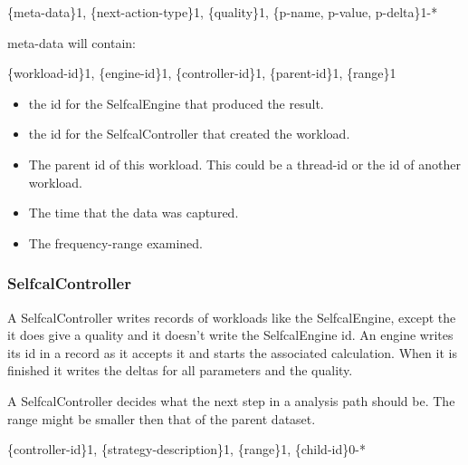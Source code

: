 \documentclass[]{lofar}
\begin{document}
        \{meta-data\}1, \{next-action-type\}1, \{quality\}1, \{p-name, p-value, p-delta\}1-*

        meta-data will contain:

        \{workload-id\}1, \{engine-id\}1, \{controller-id\}1, \{parent-id\}1, \{range\}1

        \begin{itemize}

	  \item 

            the id for the SelfcalEngine that produced the result.

	  \item 

            the id for the SelfcalController that created the workload.

	  \item 

            The parent id of this workload. This could be a thread-id
            or the id of another workload.

	  \item 

            The time that the data was captured.

	  \item 

            The frequency-range examined.

        \end{itemize}

      \subsubsection{SelfcalController}
      \label{subsubsec:SelfcalController}\hypertarget{subsubsec:SelfcalController}{}

        A SelfcalController writes records of workloads like the
        SelfcalEngine, except the it does give a quality and it
        doesn't write the SelfcalEngine id. An engine writes its id in
        a record as it accepts it and starts the associated
        calculation. When it is finished it writes the deltas for all
        parameters and the quality.

        A SelfcalController decides what the next step in a analysis
        path should be. The range might be smaller then that of the
        parent dataset.

        \{controller-id\}1, \{strategy-description\}1, \{range\}1, \{child-id\}0-*
\end{document}
